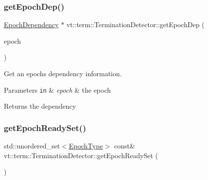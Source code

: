 \subsubsection{\texorpdfstring{get\+Epoch\+Dep()}{getEpochDep()}}
{\footnotesize\ttfamily \hyperlink{structvt_1_1term_1_1_epoch_dependency}{Epoch\+Dependency} $\ast$ vt\+::term\+::\+Termination\+Detector\+::get\+Epoch\+Dep (\begin{DoxyParamCaption}\item[{\hyperlink{namespacevt_a985a5adf291c34a3ca263b3378388236}{Epoch\+Type}}]{epoch }\end{DoxyParamCaption})\hspace{0.3cm}{\ttfamily [private]}}



Get an epoch\textquotesingle{}s dependency information. 


\begin{DoxyParams}[1]{Parameters}
\mbox{\tt in}  & {\em epoch} & the epoch\\
\hline
\end{DoxyParams}
\begin{DoxyReturn}{Returns}
the dependency 
\end{DoxyReturn}
\mbox{\label{structvt_1_1term_1_1_termination_detector_a8eb6730fc343957d0a788919b641762e}} 
\subsubsection{\texorpdfstring{get\+Epoch\+Ready\+Set()}{getEpochReadySet()}}
{\footnotesize\ttfamily std\+::unordered\+\_\+set$<$\hyperlink{namespacevt_a985a5adf291c34a3ca263b3378388236}{Epoch\+Type}$>$ const\& vt\+::term\+::\+Termination\+Detector\+::get\+Epoch\+Ready\+Set (\begin{DoxyParamCaption}{ }\end{DoxyParamCaption})\hspace{0.3cm}{\ttfamily [inline]}}

\mbox{\label{structvt_1_1term_1_1_termination_detector_a185004af9f842c58258128456ef27160}} 
